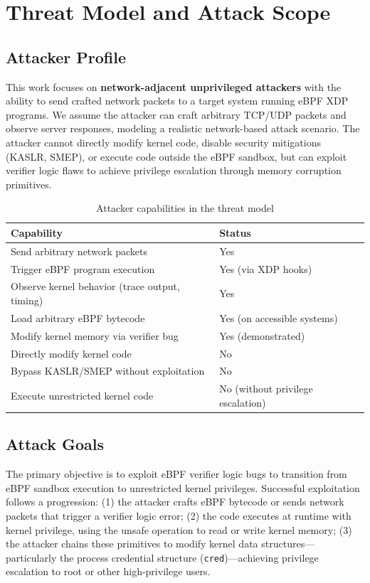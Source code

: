 \chapter{Threat Model and Attack Scope}

\section{Attacker Profile}

This work focuses on \textbf{network-adjacent unprivileged attackers} with the ability to send crafted network packets to a target system running eBPF XDP programs. We assume the attacker can craft arbitrary TCP/UDP packets and observe server responses, modeling a realistic network-based attack scenario. The attacker cannot directly modify kernel code, disable security mitigations (KASLR, SMEP), or execute code outside the eBPF sandbox, but can exploit verifier logic flaws to achieve privilege escalation through memory corruption primitives.

\begin{table}[h]
\centering
\small
\begin{tabular}{|l|l|}
\hline
\textbf{Capability} & \textbf{Status} \\
\hline
Send arbitrary network packets & Yes \\
Trigger eBPF program execution & Yes (via XDP hooks) \\
Observe kernel behavior (trace output, timing) & Yes \\
Load arbitrary eBPF bytecode & Yes (on accessible systems) \\
Modify kernel memory via verifier bug & Yes (demonstrated) \\
\hline
Directly modify kernel code & No \\
Bypass KASLR/SMEP without exploitation & No \\
Execute unrestricted kernel code & No (without privilege escalation) \\
\hline
\end{tabular}
\caption{Attacker capabilities in the threat model}
\end{table}

\section{Attack Goals}

The primary objective is to exploit eBPF verifier logic bugs to transition from eBPF sandbox execution to unrestricted kernel privileges. Successful exploitation follows a progression: (1) the attacker crafts eBPF bytecode or sends network packets that trigger a verifier logic error; (2) the code executes at runtime with kernel privilege, using the unsafe operation to read or write kernel memory; (3) the attacker chains these primitives to modify kernel data structures—particularly the process credential structure (\texttt{cred})—achieving privilege escalation to root or other high-privilege users.

